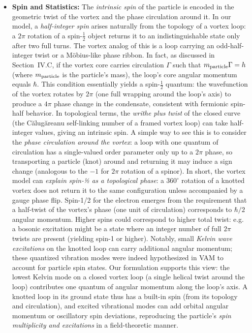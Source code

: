 \documentclass[12pt]{article}
\begin{document}
\begin{itemize}
    \item \textbf{Spin and Statistics:} The \emph{intrinsic spin} of the particle is encoded in the geometric twist of the vortex and the phase circulation around it. In our model, a \emph{half-integer spin} arises naturally from the topology of a vortex loop: a $2\pi$ rotation of a spin-$\tfrac{1}{2}$ object returns it to an indistinguishable state only after two full turns. The vortex analog of this is a loop carrying an odd-half-integer twist or a Möbius-like phase ribbon. In fact, as discussed in Section~IV.C, if the vortex core carries circulation $\Gamma$ such that $m_{\rm particle}\Gamma = h$ (where $m_{\rm particle}$ is the particle’s mass), the loop’s core angular momentum equals $\hbar$. This condition essentially yields a spin-$\tfrac{1}{2}$ quantum: the wavefunction of the vortex rotates by $2\pi$ (one full wrapping around the loop’s axis) to produce a $4\pi$ phase change in the condensate, consistent with fermionic spin-half behavior. In topological terms, the \emph{writhe plus twist} of the closed curve (the Călugăreanu self-linking number of a framed vortex loop) can take half-integer values, giving an intrinsic spin. A simple way to see this is to consider the \emph{phase circulation around the vortex}: a loop with one quantum of circulation has a single-valued order parameter only up to a $2\pi$ phase, so transporting a particle (knot) around and returning it may induce a sign change (analogous to the $-1$ for $2\pi$ rotation of a spinor). In short, the vortex model can \emph{explain spin-½ as a topological phase}: a $360^\circ$ rotation of a knotted vortex does not return it to the same configuration unless accompanied by a gauge phase flip. Spin-1/2 for the electron emerges from the requirement that a half-twist of the vortex’s phase (one unit of circulation) corresponds to $\hbar/2$ angular momentum. Higher spins could correspond to higher total twist: e.g. a bosonic excitation might be a state where an integer number of full $2\pi$ twists are present (yielding spin-1 or higher). Notably, small \emph{Kelvin wave excitations} on the knotted loop can carry additional angular momentum; these quantized vibration modes were indeed hypothesized in VAM to account for particle spin states. Our formulation supports this view: the lowest Kelvin mode on a closed vortex loop (a single helical twist around the loop) contributes one quantum of angular momentum along the loop’s axis. A knotted loop in its ground state thus has a built-in spin (from its topology and circulation), and excited vibrational modes can add orbital angular momentum or oscillatory spin deviations, reproducing the particle’s \emph{spin multiplicity and excitations} in a field-theoretic manner.

\end{itemize}
\end{document}
